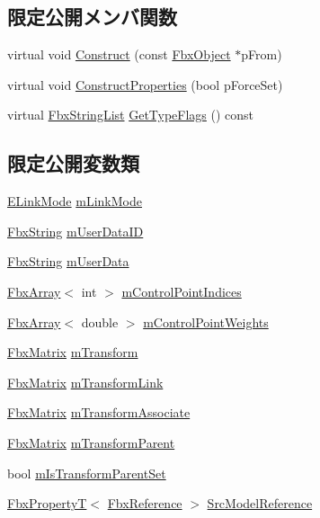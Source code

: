 \subsection*{限定公開メンバ関数}
\begin{DoxyCompactItemize}
\item 
virtual void \hyperlink{class_fbx_cluster_a80619129929789d80930b2bbb524593c}{Construct} (const \hyperlink{class_fbx_object}{Fbx\+Object} $\ast$p\+From)
\item 
virtual void \hyperlink{class_fbx_cluster_aaf923a56a7aeb0f224da890e0075dbd1}{Construct\+Properties} (bool p\+Force\+Set)
\item 
virtual \hyperlink{class_fbx_string_list}{Fbx\+String\+List} \hyperlink{class_fbx_cluster_af989ca14bdf9e025f3db49183dc09811}{Get\+Type\+Flags} () const
\end{DoxyCompactItemize}
\subsection*{限定公開変数類}
\begin{DoxyCompactItemize}
\item 
\hyperlink{class_fbx_cluster_aaa2afaedfd33eda65c46bb5a3d04dab0}{E\+Link\+Mode} \hyperlink{class_fbx_cluster_ad8d979073597b54693d7185292f2a959}{m\+Link\+Mode}
\item 
\hyperlink{class_fbx_string}{Fbx\+String} \hyperlink{class_fbx_cluster_a2124739508768e40c733bd784516a6d9}{m\+User\+Data\+ID}
\item 
\hyperlink{class_fbx_string}{Fbx\+String} \hyperlink{class_fbx_cluster_ab612a07b9a8cc381365289304d045d4c}{m\+User\+Data}
\item 
\hyperlink{class_fbx_array}{Fbx\+Array}$<$ int $>$ \hyperlink{class_fbx_cluster_ae2e94f9ff77f37d39fe8c0424a4767cc}{m\+Control\+Point\+Indices}
\item 
\hyperlink{class_fbx_array}{Fbx\+Array}$<$ double $>$ \hyperlink{class_fbx_cluster_ae077be4e5bf53227e6a93b9fe949a6d7}{m\+Control\+Point\+Weights}
\item 
\hyperlink{class_fbx_matrix}{Fbx\+Matrix} \hyperlink{class_fbx_cluster_a01d143545429b7a283df6ebf506f80bd}{m\+Transform}
\item 
\hyperlink{class_fbx_matrix}{Fbx\+Matrix} \hyperlink{class_fbx_cluster_a950cc0c83f99d547dfe5288a83bef530}{m\+Transform\+Link}
\item 
\hyperlink{class_fbx_matrix}{Fbx\+Matrix} \hyperlink{class_fbx_cluster_a6569e76ce05716a88784df2021a075e4}{m\+Transform\+Associate}
\item 
\hyperlink{class_fbx_matrix}{Fbx\+Matrix} \hyperlink{class_fbx_cluster_adbdefba2d9f582adb85dc403916748bc}{m\+Transform\+Parent}
\item 
bool \hyperlink{class_fbx_cluster_aeddcd0b25a00cca35fce5d21e0b7fd32}{m\+Is\+Transform\+Parent\+Set}
\item 
\hyperlink{class_fbx_property_t}{Fbx\+PropertyT}$<$ \hyperlink{fbxtypes_8h_a44df6a2eec915cf27cd481e5c5e48a24}{Fbx\+Reference} $>$ \hyperlink{class_fbx_cluster_a7d34c8c9e6e527382c2bf2530a9df609}{Src\+Model\+Reference}
\end{DoxyCompactItemize}
